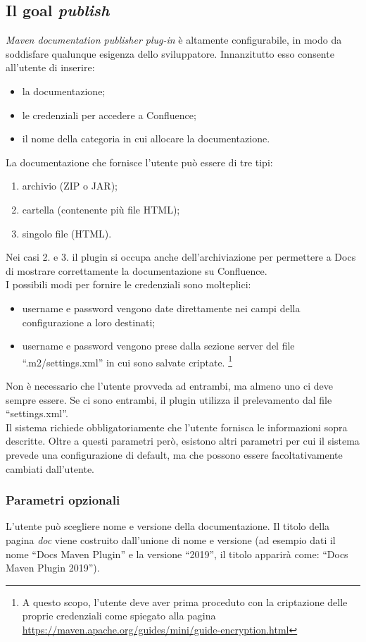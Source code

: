 \subsection{Il goal \emph{publish}} \label{goalPublish}
\emph{Maven documentation publisher plug-in} è altamente configurabile, in modo da soddisfare qualunque esigenza dello sviluppatore.
Innanzitutto esso consente all'utente di inserire:
\begin{itemize}
	\item la documentazione;
	\item le credenziali per accedere a Confluence;	
	\item il nome della categoria in cui allocare la documentazione.
\end{itemize}
La documentazione che fornisce l'utente può essere di tre tipi:
\begin{enumerate}
	\item archivio (ZIP o JAR);
	\item cartella (contenente più file HTML);
	\item singolo file (HTML).
\end{enumerate}
Nei casi 2. e 3. il plugin si occupa anche dell'archiviazione per permettere a Docs di mostrare correttamente la documentazione su Confluence. \\
I possibili modi per fornire le credenziali sono molteplici:
\begin{itemize}
	\item username e password vengono date direttamente nei campi della configurazione a loro destinati;
	\item username e password vengono prese dalla sezione server del file ``.m2/settings.xml'' in cui sono salvate criptate. \footnote{A questo scopo, l'utente deve aver prima proceduto con la criptazione delle proprie credenziali come spiegato alla pagina \url{https://maven.apache.org/guides/mini/guide-encryption.html}} 
\end{itemize}
Non è necessario che l'utente provveda ad entrambi, ma almeno uno ci deve sempre essere.
Se ci sono entrambi, il plugin utilizza il prelevamento dal file ``settings.xml''. \\

Il sistema richiede obbligatoriamente che l'utente fornisca le informazioni sopra descritte.
Oltre a questi parametri però, esistono altri parametri per cui il sistema prevede una configurazione di default, ma che possono essere facoltativamente cambiati dall'utente. 

	\subsubsection{Parametri opzionali} \label{parametriOpzionali}
	L'utente può scegliere nome e versione della documentazione.
	Il titolo della pagina \emph{doc} viene costruito dall'unione di nome e versione (ad esempio dati il nome ``Docs Maven Plugin'' e la versione ``2019'', il titolo apparirà come: ``Docs Maven Plugin 2019'').


